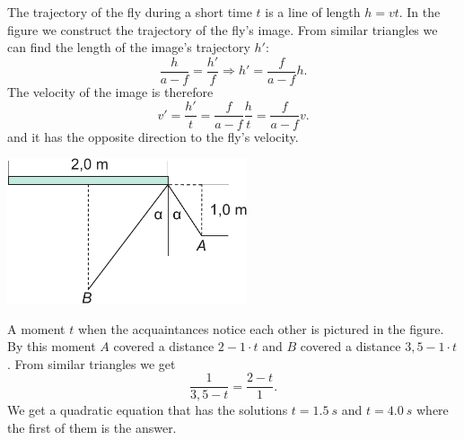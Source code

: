 \documentclass[11pt]{article}
\begin{document}

\solueng
The trajectory of the fly during a short time $t$ is a line of length $h=vt$. In the figure we construct the trajectory of the fly’s image. From similar triangles we can find the length of the image’s trajectory $h'$:
$$\frac{h}{a-f}=\frac{h'}{f} \Rightarrow h'=\frac{f}{a-f} h.$$ 
The velocity of the image is therefore
$$v' = \frac{h'}{t} = \frac{f}{a-f} \frac{h}{t} = \frac{f}{a-f} v. $$ 
and it has the opposite direction to the fly’s velocity.
\probend
\bigskip


\solueng
\begin{center}
\includegraphics[width=200pt]{2012-v2g-01-peegel_lah}
\end{center}
A moment $t$ when the acquaintances notice each other is pictured in the figure. By this moment $A$ covered a distance $2-1\cdot t$ and $B$ covered a distance $3,5-1\cdot t$. From similar triangles we get
\[
\frac{1}{3,5-t}=\frac{2-t}{1}.
\] 
We get a quadratic equation that has the solutions $t=\SI{1,5}{s}$ and $t=\SI{4,0}{s}$ where the first of them is the answer.
\probend
\bigskip

\end{document}
